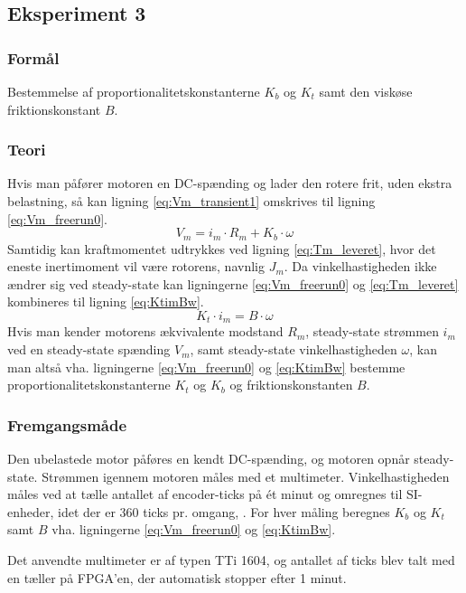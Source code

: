 \subsection{Eksperiment 3}
\label{ss:eksperiment3}
\subsubsection{Formål}
Bestemmelse af proportionalitetskonstanterne \(K_b\) og \(K_t\) samt den viskøse friktionskonstant \(B\).

\subsubsection{Teori}
Hvis man påfører motoren en DC-spænding og lader den rotere frit, uden ekstra belastning,
så kan ligning \ref{eq:Vm_transient1} omskrives til ligning \ref{eq:Vm_freerun0}.
\begin{equation}
	V_m=i_m\cdot{R_m}+K_b\cdot\omega
	\label{eq:Vm_freerun0}
 \end{equation}
Samtidig kan kraftmomentet udtrykkes ved ligning \ref{eq:Tm_leveret}, hvor det eneste inertimoment vil være
rotorens, navnlig \(J_m\).
Da vinkelhastigheden ikke ændrer sig ved steady-state kan ligningerne \ref{eq:Vm_freerun0} og \ref{eq:Tm_leveret} kombineres
til ligning \ref{eq:KtimBw}.
\begin{equation}
	K_t\cdot{i_m}=B\cdot\omega
	\label{eq:KtimBw}
 \end{equation}
Hvis man kender motorens ækvivalente modstand \(R_m\), steady-state strømmen \(i_m\) ved en steady-state spænding \(V_m\),
samt steady-state vinkelhastigheden \(\omega\), kan man altså vha. ligningerne \ref{eq:Vm_freerun0} og \ref{eq:KtimBw} bestemme
proportionalitetskonstanterne \(K_t\) og \(K_b\)%
og friktionskonstanten \(B\).
\subsubsection{Fremgangsmåde}
Den ubelastede motor påføres en kendt DC-spænding, og motoren opnår steady-state.
Strømmen igennem motoren måles med et multimeter.
Vinkelhastigheden måles ved at tælle antallet af encoder-ticks på ét minut og omregnes til SI-enheder, 
idet der er 360 ticks pr. omgang, \citep{emgmotor}.
For hver måling beregnes \(K_b\) og \(K_t\) samt \(B\) vha. ligningerne \ref{eq:Vm_freerun0} og \ref{eq:KtimBw}.

Det anvendte multimeter er af typen TTi 1604,
og antallet af ticks blev talt med en tæller på FPGA'en, der automatisk stopper efter 1 minut.
